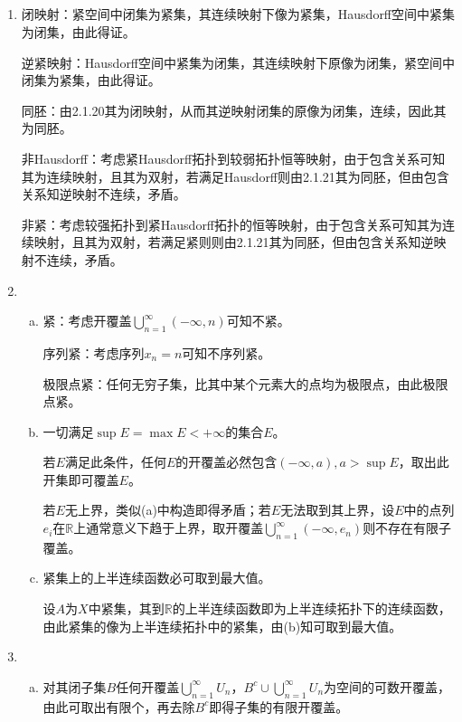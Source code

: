 \documentclass[a4paper,UTF8,fontset=windows]{ctexart}
\begin{document}
\subsection{}
\begin{enumerate}[(1)]
    \item
    闭映射：紧空间中闭集为紧集，其连续映射下像为紧集，Hausdorff空间中紧集为闭集，由此得证。
    
    逆紧映射：Hausdorff空间中紧集为闭集，其连续映射下原像为闭集，紧空间中闭集为紧集，由此得证。
    
    同胚：由2.1.20其为闭映射，从而其逆映射闭集的原像为闭集，连续，因此其为同胚。
    
    非Hausdorff：考虑紧Hausdorff拓扑到较弱拓扑恒等映射，由于包含关系可知其为连续映射，且其为双射，若满足Hausdorff则由2.1.21其为同胚，但由包含关系知逆映射不连续，矛盾。
    
    非紧：考虑较强拓扑到紧Hausdorff拓扑的恒等映射，由于包含关系可知其为连续映射，且其为双射，若满足紧则则由2.1.21其为同胚，但由包含关系知逆映射不连续，矛盾。
    
    \item
    \begin{enumerate}[(a)]
    \item
    紧：考虑开覆盖$\bigcup_{n=1}^\infty(-\infty,n)$可知不紧。
    
    序列紧：考虑序列$x_n=n$可知不序列紧。
    
    极限点紧：任何无穷子集，比其中某个元素大的点均为极限点，由此极限点紧。
    
    \item
    一切满足$\sup E=\max E<+\infty$的集合$E$。
    
    若$E$满足此条件，任何$E$的开覆盖必然包含$(-\infty,a),a>\sup E$，取出此开集即可覆盖$E$。
    
    若$E$无上界，类似(a)中构造即得矛盾；若$E$无法取到其上界，设$E$中的点列$e_i$在$\mathbb{R}$上通常意义下趋于上界，取开覆盖$\bigcup_{n=1}^\infty(-\infty,e_n)$则不存在有限子覆盖。
    
    \item
    紧集上的上半连续函数必可取到最大值。
    
    设$A$为$X$中紧集，其到$\mathbb{R}$的上半连续函数即为上半连续拓扑下的连续函数，由此紧集的像为上半连续拓扑中的紧集，由(b)知可取到最大值。
    \end{enumerate}
    
    \item
    \begin{enumerate}[(a)]
    \item
    对其闭子集$B$任何开覆盖$\bigcup_{n=1}^\infty U_n$，$B^c\cup\bigcup_{n=1}^\infty U_n$为空间的可数开覆盖，由此可取出有限个，再去除$B^c$即得子集的有限开覆盖。
    

\end{enumerate}
\end{enumerate}
\end{document}
